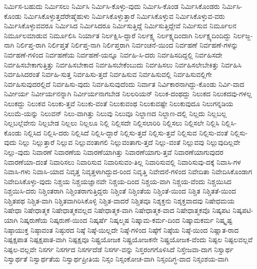 {ನಿರ್ಮಿಸ-ಬಹುದು
ನಿರ್ಮಿಸಲು
ನಿರ್ಮಿಸಿ
ನಿರ್ಮಿಸಿ-ಕೊಳ್ಳು-ವುದು
ನಿರ್ಮಿಸಿ-ಕೊಂಡ
ನಿರ್ಮಿಸಿಕೊಂಡರು
ನಿರ್ಮಿಸಿ-ಕೊಂಡು
ನಿರ್ಮಿಸಿಕೊಳ್ಳುತ್ತದೆರೇಷ್ಮೆಹುಳು
ನಿರ್ಮಿಸಿಕೊಳ್ಳುತ್ತಾರೆ
ನಿರ್ಮಿಸಿಕೊಳ್ಳುವ
ನಿರ್ಮಿಸಿಕೊಳ್ಳುವ-ವರು
ನಿರ್ಮಿಸಿಕೊಳ್ಳುವವರೂ
ನಿರ್ಮಿಸಿದ
ನಿರ್ಮಿಸಿದರೂ
ನಿರ್ಮಿಸುತ್ತಿದ್ದೆ
ನಿರ್ಮಿಸುತ್ತಿದ್ದೇವೆ
ನಿರ್ಮಿಸುವ
ನಿರ್ಮೂಲನ
ನಿರ್ಮೂಲಮಾಡುವ
ನಿರ್ಮೂಲಿಸಿ
ನಿರ್ಯಾತ
ನಿರ್ಲಕ್ಷಿಸಿ-ದ್ದಾರೆ
ನಿರ್ಲಕ್ಷ್ಯ
ನಿರ್ಲಕ್ಷ್ಯದಿಂದಾಗಿ
ನಿರ್ಲಕ್ಷ್ಯದಿಂದಿದ್ದು
ನಿರ್ಲಜ್ಜ-ನಾಗಿ
ನಿರ್ಲಿಪ್ತ-ರಾಗಿ
ನಿರ್ಲಿಪ್ತತೆ
ನಿರ್ಲಿಪ್ತ-ನಾಗಿ
ನಿರ್ಲಿಪ್ತರಾಗಿ
ನಿರ್ವಂಚನೆ-ಯಿಂದ
ನಿರ್ವಹಣೆ
ನಿರ್ವಹಣೆ-ಗಳನ್ನು
ನಿರ್ವಹಣೆ-ಗಳಿಂದ
ನಿರ್ವಹಣೆಯ
ನಿರ್ವಹಣೆ-ಯನ್ನೂ
ನಿರ್ವಹಿ-ಸಿ-ದರು
ನಿರ್ವಹಿಸದಿದ್ದಲ್ಲಿ
ನಿರ್ವಹಿಸದೇ
ನಿರ್ವಹಿಸಬೇಕಾಗುತ್ತಿತ್ತು
ನಿರ್ವಹಿಸಬೇಕಾದ
ನಿರ್ವಹಿಸಬೇಕೆಂಬುದು
ನಿರ್ವಹಿಸಲು
ನಿರ್ವಹಿಸಲೇಬೇಕಿತ್ತು
ನಿರ್ವಹಿಸಿ
ನಿರ್ವಹಿಸಿದರಂತೆ
ನಿರ್ವಹಿ-ಸುತ್ತ
ನಿರ್ವಹಿಸು-ತ್ತದೆ
ನಿರ್ವಹಿಸುವ
ನಿರ್ವಹಿಸುವಲ್ಲಿ
ನಿರ್ವಹಿಸುವಲ್ಲಿಗೇ
ನಿರ್ವಹಿಸುವುದರಲ್ಲಿದೆ
ನಿರ್ವಹಿಸು-ವುದು
ನಿರ್ವಹಿಸುವುದೆಂದು
ನಿರ್ವಾತ
ನಿರ್ವಿಕಾರನಾಗಿದ್ದು-ಕೊಂಡು
ನಿರ್ವಿ-ವಾದ
ನಿರ್ವೀರ್ಯ
ನಿರ್ವೀರ್ಯನನ್ನಾಗಿ
ನಿರ್ವೀರ್ಯನಾಗಬೇಡ
ನಿಲಲರಿಯನ್
ನಿಲುಕ-ದಂಥದ್ದು
ನಿಲುಕದ
ನಿಲುಕದವು-ಗಳಲ್ಲ
ನಿಲುಕದ್ದು
ನಿಲುಕವ
ನಿಲುಕು-ತ್ತವೆ
ನಿಲುಕು-ವಂತೆ
ನಿಲುಕುವಂಥ
ನಿಲುಕುವಷ್ಟೇ
ನಿಲುಕುವುದೂ
ನಿಲುಗನ್ನಡಿಯ
ನಿಲುಮೆ-ಯನ್ನು
ನಿಲುವನ್
ನಿಲು-ವಾಗಿತ್ತು
ನಿಲುವು
ನಿಲುವೂ
ನಿಲ್ದಾಣದ
ನಿಲ್ದಾಣ-ದಲ್ಲಿ
ನಿಲ್ಲದು
ನಿಲ್ಲಬಲ್ಲ
ನಿಲ್ಲಬಲ್ಲೆವೇನು
ನಿಲ್ಲಬೇಡ
ನಿಲ್ಲಲು
ನಿಲ್ಲಲೂ
ನಿಲ್ಲಿ
ನಿಲ್ಲಿಸದೇ
ನಿಲ್ಲಿಸಲಾರಿರಿ
ನಿಲ್ಲಿಸಲು
ನಿಲ್ಲಿಸಲೇ
ನಿಲ್ಲಿಸಿ
ನಿಲ್ಲಿಸಿ-ಕೊಂಡು
ನಿಲ್ಲಿಸಿದ
ನಿಲ್ಲಿಸಿ-ದರು
ನಿಲ್ಲಿಸಿದೆ
ನಿಲ್ಲಿಸಿ-ದ್ದಾರೆ
ನಿಲ್ಲಿಸು-ತ್ತದೆ
ನಿಲ್ಲಿಸು-ತ್ತವೆ
ನಿಲ್ಲಿಸುವ
ನಿಲ್ಲಿಸು-ವಂತೆ
ನಿಲ್ಲಿಸು-ವುದು
ನಿಲ್ಲು
ನಿಲ್ಲುತ್ತಾರೆ
ನಿಲ್ಲುವ
ನಿಲ್ಲುವಂತಾಗಲಿ
ನಿಲ್ಲುವಂತಾಗು-ತ್ತದೆ
ನಿಲ್ಲು-ವಂತೆ
ನಿಲ್ಲುವವು
ನಿಲ್ಲುವುದಿಲ್ಲವೇ
ನಿಲ್ಲು-ವುದು
ನಿವಾರಣೆ
ನಿವಾರಣೆಯ
ನಿವಾರಣೆಯಾಗಿತ್ತು
ನಿವಾರಣೆಯಾಗು-ತ್ತವೆ
ನಿವಾರಣೆಯಾಗುವುದರ
ನಿವಾರಣೆಯಾ-ದಂತೆ
ನಿವಾರಿಸಲು
ನಿವಾರಿಸುವ
ನಿವಾರಿಸುವಂ-ತಿಲ್ಲ
ನಿವಾರಿಸುವಲ್ಲಿ
ನಿವಾರಿಸುವು-ದಕ್ಕೆ
ನಿವಾಸಿ-ಗಳ
ನಿವಾಸಿ-ಗಳು
ನಿವಾಸಿ-ಯಾದ
ನಿವೃತ್ತ
ನಿವೃತ್ತಳಾಗಿದ್ದುದ-ರಿಂದ
ನಿವೃತ್ತಿ
ನಿವೇದನೆ-ಗಳಿಂದ
ನಿವೇದಿತಾ
ನಿವೇದಿಸಿಕೊಂಡಾಗ
ನಿವೇದಿಸಿಕೊಳ್ಳು-ವುದು
ನಿಶ್ಚಯ
ನಿಶ್ಚಯಜ್ಞಾನವೇ
ನಿಶ್ಚಯ-ದಿಂದ
ನಿಶ್ಚಯ-ವಾಗಿ
ನಿಶ್ಚಯ-ವೆಂದು
ನಿಶ್ಚಯಿಸಿದ
ನಿಶ್ಚಯಿಸಿ-ದರು
ನಿಶ್ಚಿಂತರಾಗಿ
ನಿಶ್ಚಿಂತರಾಗುತ್ತಿದ್ದರು
ನಿಶ್ಚಿಂತೆ
ನಿಶ್ಚಿಂತೆಯ
ನಿಶ್ಚಿಂತೆ-ಯಿಂದ
ನಿಶ್ಚಿತ
ನಿಶ್ಚಿತತೆ-ಯಿಂದ
ನಿಶ್ಚಿತಪಥ
ನಿಶ್ಚಿತ-ವಾಗಿ
ನಿಶ್ಚಿತವಾಗಿರಿಸಿಕೊಳ್ಳಿ
ನಿಶ್ಚಿತ-ವಾದರೆ
ನಿಶ್ಚಿತವೂ
ನಿಶ್ಶಕ್ತನು
ನಿಶ್ಶಕ್ತವಾದವು
ನಿಷೇಧಮಯ
ನಿಷೇಧಾ
ನಿಷೇಧಾತ್ಮಕ
ನಿಷೇಧಾತ್ಮಕವಲ್ಲದ
ನಿಷೇಧಾತ್ಮಕ-ವಾಗಿ
ನಿಷೇಧಾತ್ಮಕ-ವಾದ
ನಿಷೇಧಾತ್ಮಕವೊ
ನಿಷ್ಕಪಟ
ನಿಷ್ಕಪಟಿ-ಯಾಗಿ
ನಿಷ್ಕರುಣೆಯ
ನಿಷ್ಕರುಣೆ-ಯಿಂದ
ನಿಷ್ಕರ್ಷೆ
ನಿಷ್ಕಲ್ಮಷ
ನಿಷ್ಕಾಮ-ಕರ್ಮ-ದಿಂದ
ನಿಷ್ಕಾಮಕರ್ಮ
ನಿಷ್ಕೃಷ್ಟ
ನಿಷ್ಠಾಯುಕ್ತ
ನಿಷ್ಠಾವಂತ
ನಿಷ್ಠುರದ
ನಿಷ್ಠೆ
ನಿಷ್ಠೆ-ಯಿಲ್ಲದೇ
ನಿಷ್ಠೆ-ಗಳಿಂದ
ನಿಷ್ಠೆಗೆ
ನಿಷ್ಠೆಯ
ನಿಷ್ಠೆ-ಯಿಂದ
ನಿಷ್ಣಾತ-ರಾದ
ನಿಷ್ಪಕ್ಷಪಾತ
ನಿಷ್ಪಕ್ಷಪಾತ-ವಾಗಿ
ನಿಷ್ಪಕ್ಷವೂ
ನಿಷ್ಪ್ರಯೋಜಕ
ನಿಷ್ಪ್ರಯೋಜಕನೇ
ನಿಷ್ಪ್ರಯೋಜಕ-ವೆಂದು
ನಿಷ್ಫಲ
ನಿಷ್ಫಲವಲ್ಲವೆ
ನಿಷ್ಫಲ-ವಲ್ಲವೇ
ನಿಸರ್ಗ
ನಿಸರ್ಗದ
ನಿಸರ್ಗದೆಡೆ
ನಿಸರ್ಗ-ವನ್ನು
ನಿಸ್ತರಂಗಗೊಳಿಸಿದೆ
ನಿಸ್ತೇಜವಾ-ದಾಗ
ನಿಸ್ವಾರ್ಥ
ನಿಸ್ವಾರ್ಥತೆ
ನಿಸ್ವಾರ್ಥತೆಯ
ನಿಸ್ವಾರ್ಥಪ್ರೀತಿಯ
ನಿಸ್ಸಂ
ನಿಸ್ಸಂಕೋಚ-ವಾಗಿ
ನಿಸ್ಸಂದಿಗ್ಧ-ವಾದ
ನಿಸ್ಸಂಶಯ-ವಾಗಿ
}
